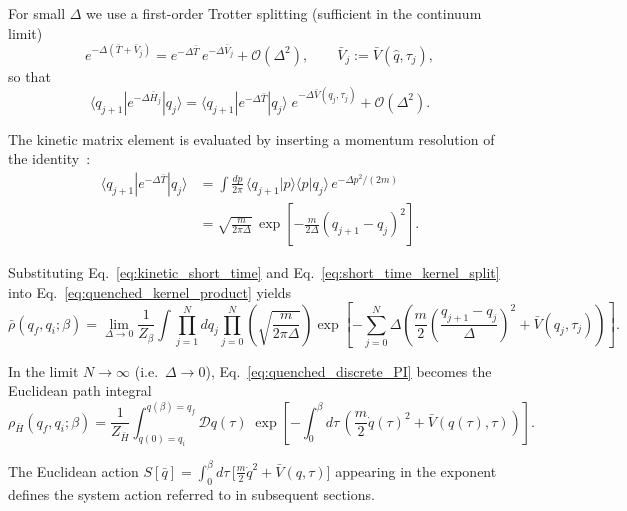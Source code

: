 For small $\Delta$ we use a first-order Trotter splitting (sufficient in the continuum
limit)~\cite{kleinertPathIntegralsQuantum2009}
\begin{equation}
    e^{-\Delta(\bar T+\bar V_j)}
    =
    e^{-\Delta \bar T}\,e^{-\Delta \bar V_j}
    +\mathcal O(\Delta^2),
    \qquad
    \bar V_j:=\bar V(\hat q,\tau_j),
    \label{eq:trotter_split}
\end{equation}
so that
\begin{equation}
    \langle q_{j+1}|e^{-\Delta \bar H_j}|q_j\rangle
    =
    \langle q_{j+1}|e^{-\Delta \bar T}|q_j\rangle\;
    e^{-\Delta \bar V(q_j,\tau_j)}
    +\mathcal O(\Delta^2).
    \label{eq:short_time_kernel_split}
\end{equation}

The kinetic matrix element is evaluated by inserting a momentum resolution of
the identity~\cite{feynmanQuantumMechanicsPath1965,schulmanTechniquesApplicationsPath1981}:
\begin{align}
    \langle q_{j+1}|e^{-\Delta \bar T}|q_j\rangle
    &=
    \int \frac{dp}{2\pi}\,
    \langle q_{j+1}|p\rangle\langle p|q_j\rangle\,e^{-\Delta p^2/(2m)}
    \nonumber\\
    &=
    \sqrt{\frac{m}{2\pi\Delta}}\,
    \exp\!\left[-\frac{m}{2\Delta}(q_{j+1}-q_j)^2\right].
    \label{eq:kinetic_short_time}
\end{align}
\begin{widetext}
Substituting Eq.~\eqref{eq:kinetic_short_time} and Eq.~\eqref{eq:short_time_kernel_split} into
Eq.~\eqref{eq:quenched_kernel_product} yields
\begin{equation}
    \bar\rho(q_f,q_i;\beta)
    =
    \lim_{\Delta\to 0}\frac{1}{Z_\beta}
    \int \prod_{j=1}^{N} dq_j
    \prod_{j=0}^{N}
    \left(\sqrt{\frac{m}{2\pi\Delta}}\right)
    \exp\!\left[
        -\sum_{j=0}^{N}
        \Delta\left(
            \frac{m}{2}\left(\frac{q_{j+1}-q_j}{\Delta}\right)^2
            +\bar V(q_j,\tau_j)
        \right)
    \right].
    \label{eq:quenched_discrete_PI}
\end{equation}

In the limit $N\to\infty$ (i.e.\ $\Delta\to 0$), Eq.~\eqref{eq:quenched_discrete_PI} becomes the
Euclidean path integral~\cite{feynmanQuantumMechanicsPath1965,kleinertPathIntegralsQuantum2009,groscheHandbookFeynmanPath1998}
\begin{equation}
    \rho_{\bar H}(q_f,q_i;\beta)
    =
    \frac{1}{Z_{\bar H}}
    \int_{q(0)=q_i}^{q(\beta)=q_f}\!\!\mathcal D q(\tau)\;
    \exp\!\left[
        -\int_0^\beta d\tau\,
        \left(
            \frac{m}{2}\dot q(\tau)^2+\bar V(q(\tau),\tau)
        \right)
    \right].
    \label{eq:quenched_continuum_PI}
\end{equation}
\end{widetext}
The Euclidean action $S[\bar q]=\int_0^\beta d\tau\,\big[\frac{m}{2}\dot q^2+\bar V(q,\tau)\big]$
appearing in the exponent defines the system action referred to in subsequent
sections.
